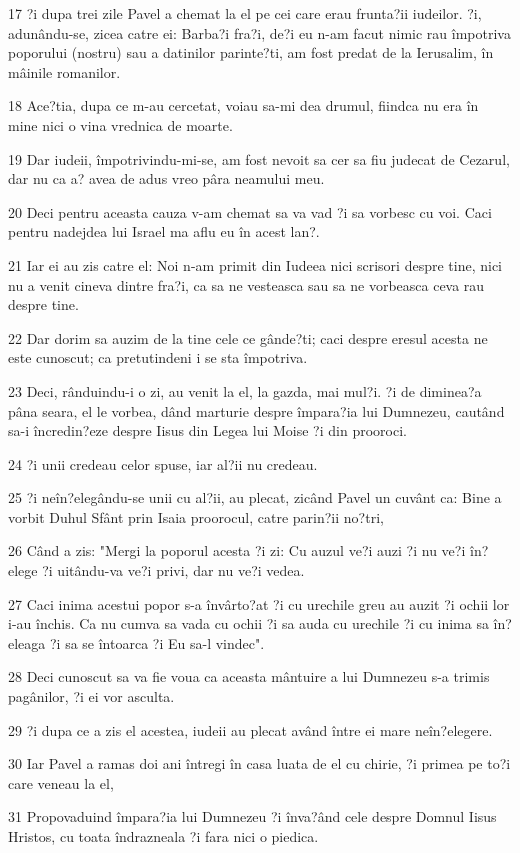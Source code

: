 \par 17 ?i dupa trei zile Pavel a chemat la el pe cei care erau frunta?ii iudeilor. ?i, adunându-se, zicea catre ei: Barba?i fra?i, de?i eu n-am facut nimic rau împotriva poporului (nostru) sau a datinilor parinte?ti, am fost predat de la Ierusalim, în mâinile romanilor.
\par 18 Ace?tia, dupa ce m-au cercetat, voiau sa-mi dea drumul, fiindca nu era în mine nici o vina vrednica de moarte.
\par 19 Dar iudeii, împotrivindu-mi-se, am fost nevoit sa cer sa fiu judecat de Cezarul, dar nu ca a? avea de adus vreo pâra neamului meu.
\par 20 Deci pentru aceasta cauza v-am chemat sa va vad ?i sa vorbesc cu voi. Caci pentru nadejdea lui Israel ma aflu eu în acest lan?.
\par 21 Iar ei au zis catre el: Noi n-am primit din Iudeea nici scrisori despre tine, nici nu a venit cineva dintre fra?i, ca sa ne vesteasca sau sa ne vorbeasca ceva rau despre tine.
\par 22 Dar dorim sa auzim de la tine cele ce gânde?ti; caci despre eresul acesta ne este cunoscut; ca pretutindeni i se sta împotriva.
\par 23 Deci, rânduindu-i o zi, au venit la el, la gazda, mai mul?i. ?i de diminea?a pâna seara, el le vorbea, dând marturie despre împara?ia lui Dumnezeu, cautând sa-i încredin?eze despre Iisus din Legea lui Moise ?i din prooroci.
\par 24 ?i unii credeau celor spuse, iar al?ii nu credeau.
\par 25 ?i neîn?elegându-se unii cu al?ii, au plecat, zicând Pavel un cuvânt ca: Bine a vorbit Duhul Sfânt prin Isaia proorocul, catre parin?ii no?tri,
\par 26 Când a zis: "Mergi la poporul acesta ?i zi: Cu auzul ve?i auzi ?i nu ve?i în?elege ?i uitându-va ve?i privi, dar nu ve?i vedea.
\par 27 Caci inima acestui popor s-a învârto?at ?i cu urechile greu au auzit ?i ochii lor i-au închis. Ca nu cumva sa vada cu ochii ?i sa auda cu urechile ?i cu inima sa în?eleaga ?i sa se întoarca ?i Eu sa-l vindec".
\par 28 Deci cunoscut sa va fie voua ca aceasta mântuire a lui Dumnezeu s-a trimis pagânilor, ?i ei vor asculta.
\par 29 ?i dupa ce a zis el acestea, iudeii au plecat având între ei mare neîn?elegere.
\par 30 Iar Pavel a ramas doi ani întregi în casa luata de el cu chirie, ?i primea pe to?i care veneau la el,
\par 31 Propovaduind împara?ia lui Dumnezeu ?i înva?ând cele despre Domnul Iisus Hristos, cu toata îndrazneala ?i fara nici o piedica.


